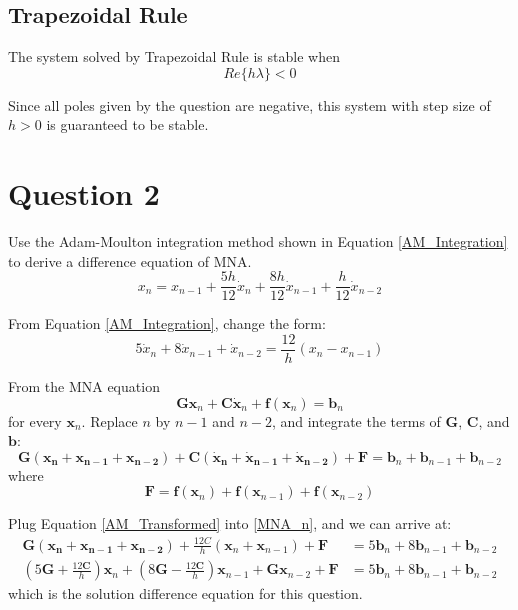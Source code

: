 \documentclass[a4paper,titlepage, 12pt]{article}
\begin{document}
		\subsection{Trapezoidal Rule}
			The system solved by Trapezoidal Rule is stable when 
			$$
				Re\{h\lambda\} < 0
			$$
			
			Since all poles given by the question are negative, this system with step size of $h > 0$ is guaranteed to be stable. 

	\section{Question 2}
		Use the Adam-Moulton integration method shown in Equation \ref{AM_Integration} to derive a difference equation of MNA. 
		\begin{equation}
			x_n = x_{n-1} + \frac{5h}{12}\dot{x}_n + \frac{8h}{12}\dot{x}_{n-1} + \frac{h}{12}\dot{x}_{n-2}
			\label{AM_Integration}
		\end{equation}
		
		From Equation \ref{AM_Integration}, change the form:
		\begin{equation}
			5\dot{x}_{n} + 8\dot{x}_{n-1} + \dot{x}_{n-2} = \frac{12}{h}(x_n - x_{n-1})
			\label{AM_Transformed}
		\end{equation}
		
		From the MNA equation 
		$$
			\boldsymbol{G}\boldsymbol{x}_n + \boldsymbol{C}\boldsymbol{\dot{x}}_n + \boldsymbol{f}(\boldsymbol{x}_n)= \boldsymbol{b}_n
		$$
		for every $\boldsymbol{x}_n$. Replace $n$ by $n-1$ and $n-2$, and integrate the terms of $\boldsymbol{G}$, $\boldsymbol{C}$, and $\boldsymbol{b}$:
		\begin{equation}
			\boldsymbol{G}(\boldsymbol{x_n} + \boldsymbol{x_{n-1}} + \boldsymbol{x_{n-2}}) + \boldsymbol{C}(\boldsymbol{\dot{x}_n} + \boldsymbol{\dot{x}_{n-1}} + \boldsymbol{\dot{x}_{n-2}}) + \boldsymbol{F}= \boldsymbol{b}_n + \boldsymbol{b}_{n - 1} + \boldsymbol{b}_{n-2}
			\label{MNA_n}
		\end{equation}
		where 
		$$
			\boldsymbol{F} = \boldsymbol{f}(\boldsymbol{x}_n) + \boldsymbol{f}(\boldsymbol{x}_{n - 1}) + \boldsymbol{f}(\boldsymbol{x}_{n - 2})
		$$
		
		Plug Equation \ref{AM_Transformed} into \ref{MNA_n}, and we can arrive at:
		\begin{align*}
			\boldsymbol{G}(\boldsymbol{x_n} + \boldsymbol{x_{n-1}} + \boldsymbol{x_{n-2}}) + \frac{12C}{h}(\boldsymbol{x}_n + \boldsymbol{x}_{n - 1}) + \boldsymbol{F} &= 5\boldsymbol{b}_n + 8\boldsymbol{b}_{n-1} + \boldsymbol{b}_{n-2}\\
			(5\boldsymbol{G} + \frac{12\boldsymbol{C}}{h})\boldsymbol{x}_n + (8\boldsymbol{G} - \frac{12\boldsymbol{C}}{h})\boldsymbol{x}_{n-1} + \boldsymbol{G}\boldsymbol{x}_{n - 2} + \boldsymbol{F} &= 5\boldsymbol{b}_n + 8\boldsymbol{b}_{n-1} + \boldsymbol{b}_{n-2}
		\end{align*}
		which is the solution difference equation for this question. 
		
\end{document}
